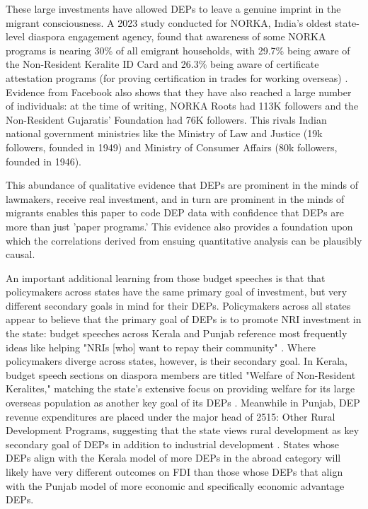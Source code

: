 \documentclass[doublespace,nopageskip]{UVAthesis}
\begin{document}
   These large investments have allowed DEPs to leave a genuine imprint in the migrant consciousness. A 2023 study conducted for NORKA, India's oldest state-level diaspora engagement agency, found that awareness of some NORKA programs is nearing 30\% of all emigrant households, with 29.7\% being aware of the Non-Resident Keralite ID Card and 26.3\% being aware of certificate attestation programs (for proving certification in trades for working overseas) \citep{rajan_kerala_nodate}. Evidence from Facebook also shows that they have also reached a large number of individuals: at the time of writing, NORKA Roots had 113K followers and the Non-Resident Gujaratis' Foundation had 76K followers. This rivals Indian national government ministries like the Ministry of Law and Justice (19k followers, founded in 1949) and Ministry of Consumer Affairs (80k followers, founded in 1946). 
   
    This abundance of qualitative evidence that DEPs are prominent in the minds of lawmakers, receive real investment, and in turn are prominent in the minds of migrants enables this paper to code DEP data with confidence that DEPs are more than just 'paper programs.' This evidence also provides a foundation upon which the correlations derived from ensuing quantitative analysis can be plausibly causal.
    
    An important additional learning from those budget speeches is that that policymakers across states have the same primary goal of investment, but very different secondary goals in mind for their DEPs. Policymakers across all states appear to believe that the primary goal of DEPs is to promote NRI investment in the state: budget speeches across Kerala and Punjab reference most frequently ideas like helping "NRIs [who] want to repay their community" \citep{singh_badal_speech_2017}. Where policymakers diverge across states, however, is their secondary goal. In Kerala, budget speech sections on diaspora members are titled "Welfare of Non-Resident Keralites," matching the state's extensive focus on providing welfare for its large overseas population as another key goal of its DEPs \citep{isaac_government_2016}. Meanwhile in Punjab, DEP revenue expenditures are placed under the major head of 2515: Other Rural Development Programs, suggesting that the state views rural development as key secondary goal of DEPs in addition to industrial development \citep{finance_department_punjab_detailed_2013}. States whose DEPs align with the Kerala model of more DEPs in the abroad category will likely have very different outcomes on FDI than those whose DEPs that align with the Punjab model of more economic and specifically economic advantage DEPs.
    
\end{document}
